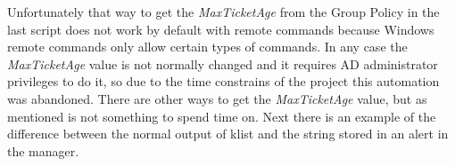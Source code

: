 \linej


\linej
Unfortunately that way to get the \textit{MaxTicketAge} from the Group Policy in the last script does not work by default with remote commands because Windows remote commands only allow certain types of commands.
In any case the \textit{MaxTicketAge} value is not normally changed and it requires AD administrator privileges to do it, so due to the time constrains of the project this automation was abandoned. There are other ways to get the \textit{MaxTicketAge} value, but as mentioned is not something to spend time on.
\linej
\linej
Next there is an example of the difference between the normal output of klist and the string stored in an alert in the manager.

